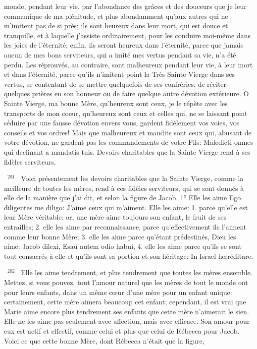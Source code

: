 \documentclass[paper=a5,pagesize=pdftex,fontsize=15pt,headinclude=on,twoside=off]{scrbook}
\newcommand{\negphantom}[1]{\settowidth{\dimen0}{#1}\hspace*{-\dimen0}}
\newcommand{\versenb}[1]{\par \vspace{10pt}~\negphantom{~${}^{#1}$~}${}^{#1}$~}
\begin{document}
monde, pendant leur vie, par l'abondance des grâces et des douceurs que je leur communique de ma plénitude, et
plus abondamment qu'aux autres qui ne m'imitent pas de si près; ils sont heureux dans leur mort, qui est douce et
tranquille, et à laquelle j'assiste ordinairement, pour les conduire moi-même dans les joies de l'éternité; enfin, ils
seront heureux dans l'éternité, parce que jamais aucun de mes bons serviteurs, qui a imité mes vertus pendant sa
vie, n'a été perdu.
Les réprouvés, au contraire, sont malheureux pendant leur vie, à leur mort et dans l'éternité, parce qu'ils n'imitent
point la Très Sainte Vierge dans ses vertus, se contentant de se mettre quelquefois de ses confréries, de réciter
quelques prières en son honneur ou de faire quelque autre dévotion extérieure. O Sainte Vierge, ma bonne Mère,
qu'heureux sont ceux, je le répète avec les transports de mon coeur, qu'heureux sont ceux et celles qui, ne se
laissant point séduire par une fausse dévotion envers vous, gardent fidèlement vos voies, vos conseils et vos
ordres! Mais que malheureux et maudits sont ceux qui, abusant de votre dévotion, ne gardent pas les
commandements de votre Fils: Maledicti omnes qui declinant a mandatis tuis.
Devoirs charitables que la Sainte Vierge rend à ses fidèles serviteurs.
\versenb{201} Voici présentement les devoirs charitables que la Sainte Vierge, comme la meilleure de toutes les mères,
rend à ces fidèles serviteurs, qui se sont donnés à elle de la manière que j'ai dit, et selon la figure de Jacob.
1° Elle les aime
Ego diligentes me diligo: J'aime ceux qui m'aiment.
Elle les aime: 1. parce qu'elle est leur Mère véritable: or, une mère aime toujours son enfant, le fruit de ses
entrailles; 2. elle les aime par reconnaissance, parce qu'effectivement ils l'aiment comme leur bonne Mère; 3. elle
les aime parce qu'étant prédestinés, Dieu les aime: Jacob dilexi, Esaü autem odio habui, 4. elle les aime parce
qu'ils se sont tout consacrés à elle et qu'ils sont sa portion et son héritage: In Israel hœréditare.
\versenb{202} Elle les aime tendrement, et plus tendrement que toutes les mères ensemble. Mettez, si vous pouvez, tout
l'amour naturel que les mères de tout le monde ont pour leurs enfants, dans un même cœur d'une mère pour un
enfant unique: certainement, cette mère aimera beaucoup cet enfant; cependant, il est vrai que Marie aime encore
plus tendrement ses enfants que cette mère n'aimerait le sien.
Elle ne les aime pas seulement avec affection, mais avec efficace. Son amour pour eux est actif et effectif, comme
celui et plus que celui de Rébecca pour Jacob. Voici ce que cette bonne Mère, dont Rébecca n'était que la figure,
\end{document}
